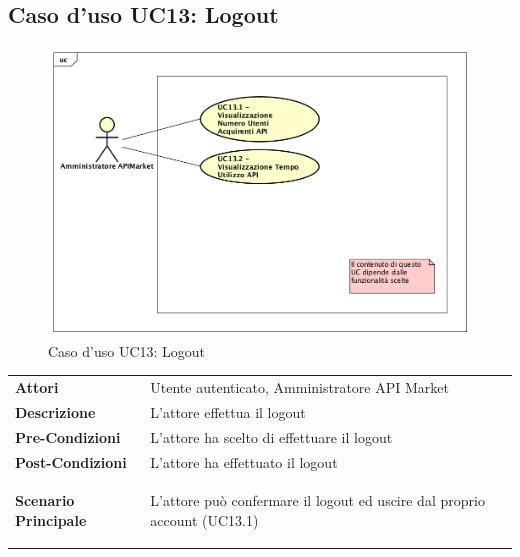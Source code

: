 \newpage
\subsection{Caso d'uso UC13: Logout}
\label{UC13}
\begin{figure}[ht]
	\centering
	\includegraphics[scale=0.45]{UML/UC13.png}
	\caption{Caso d'uso UC13: Logout}
\end{figure}

\renewcommand*{\arraystretch}{1.6}
\begin{longtable}{ l | p{11cm}}
	\hline
	\rowcolor{Gray}
	\multicolumn{2}{c}{UC13 - Logout} \\
	\hline
	\textbf{Attori} &Utente autenticato, Amministratore API Market \\
	\textbf{Descrizione} &L'attore effettua il logout \\
	\textbf{Pre-Condizioni} &L'attore ha scelto di effettuare il logout\\
	\textbf{Post-Condizioni}&L'attore ha effettuato il logout\\
	\textbf{Scenario Principale} & \begin{enumerate*}[label=(\arabic*.),itemjoin={\newline}]
		\item L'attore può confermare il logout ed uscire dal proprio account (UC13.1)
	\end{enumerate*}\\
\end{longtable}

